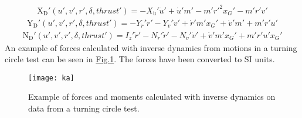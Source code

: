 \begin{equation}\label{equation:03.01_inverse_dynamics:eqxd}
\begin{split}\displaystyle \operatorname{X_{D}'}{\left(u',v',r',\delta,thrust' \right)} = - X_{\dot{u}}' \dot{u}' + \dot{u}' m' - m' r'^{2} x_{G}' - m' r' v'\end{split}
\end{equation}\begin{equation}\label{equation:03.01_inverse_dynamics:eqyd}
\begin{split}\displaystyle \operatorname{Y_{D}'}{\left(u',v',r',\delta,thrust' \right)} = - Y_{\dot{r}}' \dot{r}' - Y_{\dot{v}}' \dot{v}' + \dot{r}' m' x_{G}' + \dot{v}' m' + m' r' u'\end{split}
\end{equation}\begin{equation}\label{equation:03.01_inverse_dynamics:eqnd}
\begin{split}\displaystyle \operatorname{N_{D}'}{\left(u',v',r',\delta,thrust' \right)} = I_{z}' \dot{r}' - N_{\dot{r}}' \dot{r}' - N_{\dot{v}}' \dot{v}' + \dot{v}' m' x_{G}' + m' r' u' x_{G}'\end{split}
\end{equation}
\sphinxAtStartPar
An example of forces calculated with inverse dynamics from motions in a turning circle test can be seen in \hyperref[\detokenize{03.01_inverse_dynamics:fig-inverse}]{Fig.\@ \ref{\detokenize{03.01_inverse_dynamics:fig-inverse}}}. The forces have been converted to SI units.

\begin{figure}
    \centering
    \texttt{[image: ka]}
    \caption{Example of forces and moments calculated with inverse dynamics on data from a turning circle test.}
    \label{\detokenize{03.01_inverse_dynamics:fig-inverse}}
\end{figure}